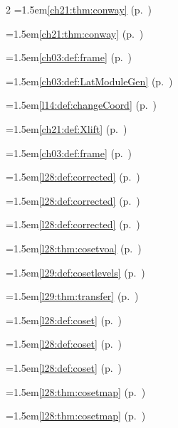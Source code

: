 \begin{multicols}{2}
\hangindent=1.5em\quad \ref{ch21:thm:conway} (p.~\pageref{ch21:thm:conway})\par
\hangindent=1.5em\quad \ref{ch21:thm:conway} (p.~\pageref{ch21:thm:conway})\par
\hangindent=1.5em\quad \ref{ch03:def:frame} (p.~\pageref{ch03:def:frame})\par
\hangindent=1.5em\quad \ref{ch03:def:LatModuleGen} (p.~\pageref{ch03:def:LatModuleGen})\par
\hangindent=1.5em\quad \ref{l14:def:changeCoord} (p.~\pageref{l14:def:changeCoord})\par
\hangindent=1.5em\quad \ref{ch21:def:Xlift} (p.~\pageref{ch21:def:Xlift})\par
\hangindent=1.5em\quad \ref{ch03:def:frame} (p.~\pageref{ch03:def:frame})\par
\hangindent=1.5em\quad \ref{l28:def:corrected} (p.~\pageref{l28:def:corrected})\par
\hangindent=1.5em\quad \ref{l28:def:corrected} (p.~\pageref{l28:def:corrected})\par
\hangindent=1.5em\quad \ref{l28:def:corrected} (p.~\pageref{l28:def:corrected})\par
\hangindent=1.5em\quad \ref{l28:thm:cosetvoa} (p.~\pageref{l28:thm:cosetvoa})\par
\hangindent=1.5em\quad \ref{l29:def:cosetlevels} (p.~\pageref{l29:def:cosetlevels})\par
\hangindent=1.5em\quad \ref{l29:thm:transfer} (p.~\pageref{l29:thm:transfer})\par
\hangindent=1.5em\quad \ref{l28:def:coset} (p.~\pageref{l28:def:coset})\par
\hangindent=1.5em\quad \ref{l28:def:coset} (p.~\pageref{l28:def:coset})\par
\hangindent=1.5em\quad \ref{l28:def:coset} (p.~\pageref{l28:def:coset})\par
\hangindent=1.5em\quad \ref{l28:thm:cosetmap} (p.~\pageref{l28:thm:cosetmap})\par
\hangindent=1.5em\quad \ref{l28:thm:cosetmap} (p.~\pageref{l28:thm:cosetmap})\par

\end{multicols}
